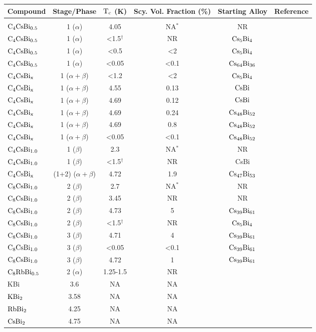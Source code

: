 \begin{tabular}{lc|cccc}
Compound & Stage/Phase & $\rm T_c$ (K) & Scy. Vol. Fraction (\%) & Starting Alloy & Reference \\
\hline\\
$\rm C_4CsBi_{0.5}$ & 1 ($\alpha$) & 4.05 & NA$^*$ & NR & \cite{mcrae85}\\
$\rm C_4CsBi_{0.5}$ & 1 ($\alpha$) & <1.5$^{\dagger}$ & NR & $\rm Cs_5Bi_4$ & \cite{yang88}\\
$\rm C_4CsBi_{0.5}$ & 1 ($\alpha$) & <0.5 & <2 & $\rm Cs_5Bi_4$& \cite{E291}\\
$\rm C_4CsBi_{0.5}$ & 1 ($\alpha$) & <0.05 & <0.1 & $\rm Cs_{64}Bi_{36}$& \cite{stang88}\\
$\rm C_4CsBi_{x}$ & 1 ($\alpha + \beta$) & <1.2 & <2 & $\rm Cs_5Bi_4$ & \cite{E291}\\
$\rm C_4CsBi_{x}$ & 1 ($\alpha + \beta$) & 4.55 & 0.13 & $\rm CsBi$& \cite{stang88}\\
$\rm C_4CsBi_{x}$ & 1 ($\alpha + \beta$) & 4.69 & 0.12 & $\rm CsBi$ & \cite{stang88}\\
$\rm C_4CsBi_{x}$ & 1 ($\alpha + \beta$) & 4.69 & 0.24 & $\rm Cs_{48}Bi_{52}$ & \cite{stang88}\\
$\rm C_4CsBi_{x}$ & 1 ($\alpha + \beta$) & 4.69 & 0.8 & $\rm Cs_{48}Bi_{52}$ & \cite{stang88}\\
$\rm C_4CsBi_{x}$ & 1 ($\alpha + \beta$) & <0.05 & <0.1 & $\rm Cs_{48}Bi_{52}$ & \cite{stang88}\\
$\rm C_4CsBi_{1.0}$ & 1 ($\beta$) & 2.3 & NA$^*$ & NR &\cite{mcrae85}\\
$\rm C_4CsBi_{1.0}$ & 1 ($\beta$) & <1.5$^{\dagger}$ & NR & CsBi & \cite{yang88}\\
$\rm C_4CsBi_{x}$ & (1+2) ($\alpha + \beta$) & 4.72 & 1.9 & $\rm Cs_{47}Bi_{53}$ & \cite{stang88}\\
$\rm C_8CsBi_{1.0}$ & 2 ($\beta$) & 2.7 & NA$^*$ & NR & \cite{mcrae85}\\
$\rm C_8CsBi_{1.0}$ & 2 ($\beta$) & 3.45 & NR & NR & \cite{bendriss86}\\
$\rm C_8CsBi_{1.0}$ & 2 ($\beta$) & 4.73 & 5 & $\rm Cs_{39}Bi_{61}$ & \cite{stang88}\\
$\rm C_8CsBi_{1.0}$ & 2 ($\beta$) & <1.5$^{\dagger}$ & NR & $\rm Cs_5Bi_4$ & \cite{yang88}\\
$\rm C_8CsBi_{1.0}$ & 3 ($\beta$) & 4.71 & 4 & $\rm Cs_{39}Bi_{61}$ & \cite{stang88}\\
$\rm C_8CsBi_{1.0}$ & 3 ($\beta$) & <0.05 & <0.1 & $\rm Cs_{39}Bi_{61}$ & \cite{stang88}\\
$\rm C_8CsBi_{1.0}$ & 3 ($\beta$) & 4.72 & 1 & $\rm Cs_{39}Bi_{61}$ & \cite{stang88}\\
$\rm C_8RbBi_{0.5}$ & 2 ($\alpha$) & 1.25-1.5 & NR & \cite{mcrae85}\\
KBi & 3.6 & NA & NA & \cite{bendriss86}\\
$\rm KBi_2$ & 3.58 & NA & NA & \cite{mcrae85}\\
$\rm RbBi_2$ & 4.25 & NA & NA & \cite{mcrae85}\\
$\rm CsBi_2$ & 4.75 & NA & NA &\cite{mcrae85}
\end{tabular}



